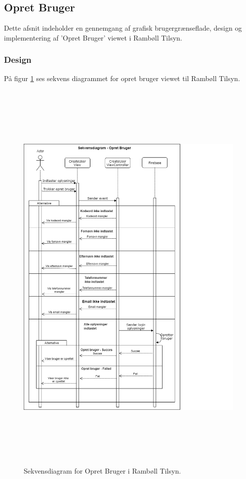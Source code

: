 \subsection{Opret Bruger}\label{sec:Opretbruger}
Dette afsnit indeholder en gennemgang af grafisk brugergrænseflade, design og implementering af 'Opret Bruger' viewet i Rambøll Tilsyn.

\subsubsection{Design}
På figur \ref{fig:OpretBrugerSekvens} ses sekvens diagrammet for opret bruger viewet til Rambøll Tilsyn.
\begin{figure}[H] %
	\centering
	\includegraphics[height=20cm, width=15cm]{../ArkitekturDesign/Design/OpretBruger/OpretBrugerSekvensDiagram}
	\caption{Sekvensdiagram for Opret Bruger i Rambøll Tilsyn.}
	\label{fig:OpretBrugerSekvens}
\end{figure}

